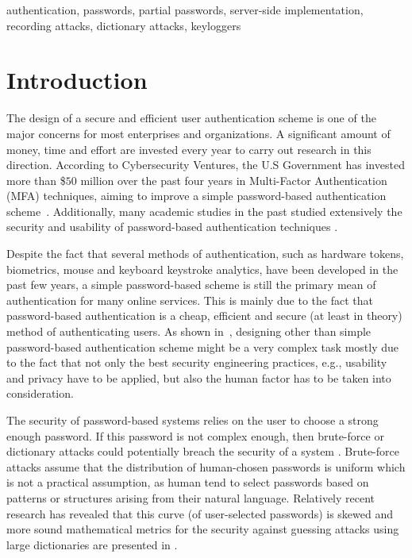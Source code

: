 \documentclass{llncs}
\begin{document}
\begin{keywords}
authentication, passwords, partial passwords, server-side implementation,
recording attacks, dictionary attacks, keyloggers
\end{keywords}

\newpage

\section{Introduction}\label{sec1}

The design of a secure and efficient user authentication scheme is one of the major concerns for most
enterprises and organizations. A significant amount of money, time and effort are invested
every year to carry out research in this direction. According
to Cybersecurity Ventures, the U.S Government has invested
more than \$$50$ million over the past four years in Multi-Factor Authentication (MFA) techniques,
aiming to improve a simple password-based authentication scheme~\cite{csecreport}. Additionally, many academic
studies in the past studied extensively the security
and usability of password-based authentication techniques
\cite{angela2,statattack1,jobush,manber,humanident1}.

Despite the fact that several methods of authentication,
such as hardware tokens, biometrics, mouse and keyboard keystroke analytics,
have been developed in
the past few years, a simple password-based scheme is still
the primary mean of authentication for many online services.
This is mainly due to the fact that password-based
 authentication is a cheap, efficient and secure (at least in theory) method of
 authenticating users. As shown in~\cite{angela2}, designing other than simple password-based authentication scheme
might be a very complex task mostly due to the fact that
not only the best security engineering practices, e.g., usability and privacy have 
to be applied, but also the human factor has to be taken into consideration.

The security of password-based systems relies on the user to choose a strong enough
password. If this password is not complex enough, then brute-force or dictionary attacks could potentially breach the security of a system \cite{statattack1}.
Brute-force attacks assume that the distribution of human-chosen passwords
is uniform which is not a practical assumption, as human tend 
to select passwords based on patterns or structures arising from their 
natural language. Relatively recent research
has revealed that this curve (of user-selected passwords) is skewed and more sound mathematical
metrics for the security against guessing attacks using large dictionaries are
presented in \cite{bonneau,bonneau2}.
\end{document}
